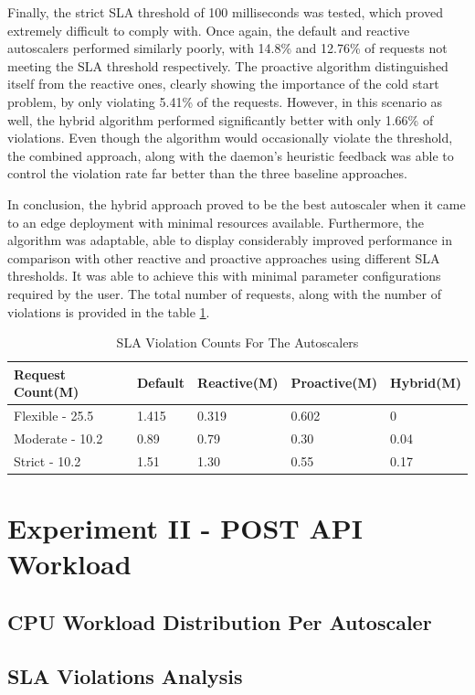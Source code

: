Finally, the strict SLA threshold of 100 milliseconds was tested, which proved extremely difficult to comply with. Once again, the default and reactive autoscalers performed similarly poorly, with 14.8\% and 12.76\% of requests not meeting the SLA threshold respectively. The proactive algorithm distinguished itself from the reactive ones, clearly showing the importance of the cold start problem, by only violating 5.41\% of the requests. However, in this scenario as well, the hybrid algorithm performed significantly better with only 1.66\% of violations. Even though the algorithm would occasionally violate the threshold, the combined approach, along with the daemon's heuristic feedback was able to control the violation rate far better than the three baseline approaches.\par

In conclusion, the hybrid approach proved to be the best autoscaler when it came to an edge deployment with minimal resources available. Furthermore, the algorithm was adaptable, able to display considerably improved performance in comparison with other reactive and proactive approaches using different SLA thresholds. It was able to achieve this with minimal parameter configurations required by the user. The total number of requests, along with the number of violations is provided in the table \ref{tab:sla-violation-count}.

\begin{table}
    \caption{SLA Violation Counts For The Autoscalers}\label{tab:sla-violation-count}
    \centering
    \begin{tabular}{|l|l|l|l|l|}
        \hline
        Request Count(M) & Default & Reactive(M) & Proactive(M) & Hybrid(M)\\
        \hline
        Flexible - 25.5  & 1.415 & 0.319 & 0.602 & 0\\
        Moderate - 10.2 & 0.89 & 0.79 & 0.30 & 0.04\\
        Strict - 10.2 & 1.51 & 1.30 & 0.55 & 0.17\\
        \hline
    \end{tabular}
\end{table}



\section{Experiment II - POST API Workload}
\label{sec:ch5-exp2-post-api}

\subsection {CPU Workload Distribution Per Autoscaler}
\label{subsec:ch5-exp2-workload-dist}

\subsection{SLA Violations Analysis}
\label{subsec:ch5-exp2-sla-violations}